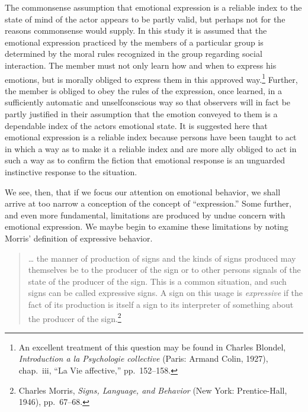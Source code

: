 \documentclass[twoside,symmetric,nobib,justified]{tufte-book}
\begin{document}
The commonsense assumption that emotional expression is a reliable index
to the state of mind of the actor appears to be partly valid, but
perhaps not for the reasons commonsense would supply. In this study it
is assumed that the emotional expression practiced by the members of a
particular group is determined by the moral rules recognized in the
group regarding social interaction. The member must not only learn how
and when to express his emotions, but is morally obliged to express them
in this approved way.\footnote{An excellent treatment of this question
  may be found in Charles Blondel, \emph{Introduction a la Psychologie
  collective} (Paris: Armand Colin, 1927), chap.~iii, ``La Vie
  affective,'' pp.~152--158.} Further, the member is obliged to obey the
rules of the expression, once learned, in a sufficiently automatic and
unselfconscious way so that observers will in fact be partly justified
in their assumption that the emotion conveyed to them is a dependable
index of the actors emotional state. It is suggested here that emotional
expression is a reliable index because persons have been taught to act
in which a way as to make it a reliable index and are more ally obliged
to act in such a way as to confirm the fiction that emotional response
is an unguarded instinctive response to the situation.

\enlargethispage{\baselineskip}

We see, then, that if we focus our attention on emotional behavior, we
shall arrive at too narrow a conception of the concept of
``expression.'' Some further, and even more fundamental, limitations are
produced by undue concern with emotional expression. We maybe begin to
examine these limitations by noting Morris' definition of expressive
behavior.

\begin{quote}
\ldots{} the manner of production of signs and the kinds of signs
produced may themselves be to the producer of the sign or to other
persons signals of the state of the producer of the sign. This is a
common situation, and such signs can be called expressive signs. A sign
on this usage is \emph{expressive} if the fact of its production is
itself a sign to its interpreter of something about the producer of the
sign.\footnote{Charles Morris, \emph{Signs, Language, and Behavior} (New
  York: Prentice-Hall, 1946), pp.~67--68.}
\end{quote}
\end{document}
